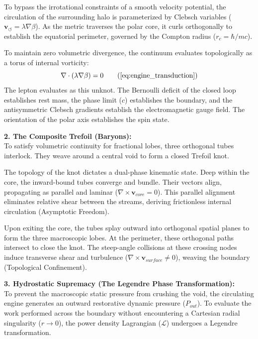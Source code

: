 To bypass the irrotational constraints of a smooth velocity potential, the circulation of the surrounding halo is parameterized by Clebsch variables ($\mathbf{v}_{\circlearrowleft} = \lambda \nabla \beta$). As the metric traverses the polar core, it curls orthogonally to establish the equatorial perimeter, governed by the Compton radius ($r_c = \hbar/mc$).

To maintain zero volumetric divergence, the continuum evaluates topologically as a torus of internal vorticity: 
\begin{equation}
    \nabla \cdot (\lambda \nabla \beta) = 0 \tag{\ref{eq:engine_transduction}}
\end{equation}
The lepton evaluates as this unknot. The Bernoulli deficit of the closed loop establishes rest mass, the phase limit ($c$) establishes the boundary, and the antisymmetric Clebsch gradients establish the electromagnetic gauge field. The orientation of the polar axis establishes the spin state.

\textbf{2. The Composite Trefoil (Baryons):} \\
To satisfy volumetric continuity for fractional lobes, three orthogonal tubes interlock. They weave around a central void to form a closed Trefoil knot. 

The topology of the knot dictates a dual-phase kinematic state. Deep within the core, the inward-bound tubes converge and bundle. Their vectors align, propagating as parallel and laminar ($\nabla \times \mathbf{v}_{core} = 0$). This parallel alignment eliminates relative shear between the streams, deriving frictionless internal circulation (Asymptotic Freedom). 

Upon exiting the core, the tubes splay outward into orthogonal spatial planes to form the three macroscopic lobes. At the perimeter, these orthogonal paths intersect to close the knot. The steep-angle collisions at these crossing nodes induce transverse shear and turbulence ($\nabla \times \mathbf{v}_{surface} \neq 0$), weaving the boundary (Topological Confinement).

\textbf{3. Hydrostatic Supremacy (The Legendre Phase Transformation):} \\
To prevent the macroscopic static pressure from crushing the void, the circulating engine generates an outward restorative dynamic pressure ($P_{out}$). To evaluate the work performed across the boundary without encountering a Cartesian radial singularity ($r \to 0$), the power density Lagrangian ($\mathcal{L}$) undergoes a Legendre transformation. 

